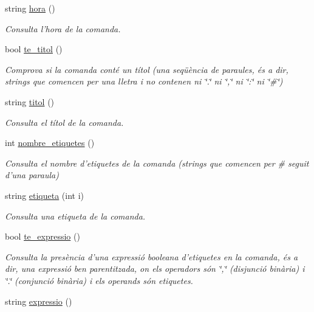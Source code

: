 \begin{DoxyCompactItemize}
string \hyperlink{class_comanda_ae8bca2ad702d3316dc1c53dcab7cac02}{hora} ()
\begin{DoxyCompactList}\small\item\em Consulta l'hora de la comanda. \end{DoxyCompactList}\item 
bool \hyperlink{class_comanda_a5452f5a877d58627cd2bd871cf31b074}{te\-\_\-titol} ()
\begin{DoxyCompactList}\small\item\em Comprova si la comanda conté un títol (una seqüència de paraules, és a dir, strings que comencen per una lletra i no contenen ni \char`\"{}.\char`\"{} ni \char`\"{},\char`\"{} ni \char`\"{}\-:\char`\"{} ni \char`\"{}\#\char`\"{}) \end{DoxyCompactList}\item 
string \hyperlink{class_comanda_ad1cefdda3db389d9ab536a59e2ee907d}{titol} ()
\begin{DoxyCompactList}\small\item\em Consulta el títol de la comanda. \end{DoxyCompactList}\item 
int \hyperlink{class_comanda_a4280b6ae2d435d9c21bbed364cb1db3d}{nombre\-\_\-etiquetes} ()
\begin{DoxyCompactList}\small\item\em Consulta el nombre d'etiquetes de la comanda (strings que comencen per \# seguit d'una paraula) \end{DoxyCompactList}\item 
string \hyperlink{class_comanda_ac80e9a80d16c6bac9a134e431bca1ed0}{etiqueta} (int i)
\begin{DoxyCompactList}\small\item\em Consulta una etiqueta de la comanda. \end{DoxyCompactList}\item 
bool \hyperlink{class_comanda_a81d17f4233e33f3baac7633546c066f0}{te\-\_\-expressio} ()
\begin{DoxyCompactList}\small\item\em Consulta la presència d'una expressió booleana d'etiquetes en la comanda, és a dir, una expressió ben parentitzada, on els operadors són \char`\"{},\char`\"{} (disjunció binària) i \char`\"{}.\char`\"{} (conjunció binària) i els operands són etiquetes. \end{DoxyCompactList}\item 
string \hyperlink{class_comanda_aa3191131592fbf58d20bed1052c31cd1}{expressio} ()

\end{DoxyCompactItemize}
